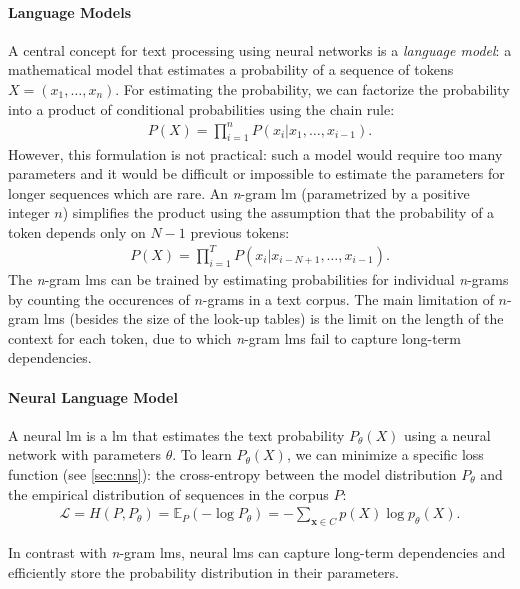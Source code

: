 {\paragraph{Language Models} A central concept for text processing using neural networks is a \emph{language model}: a mathematical model that estimates a probability of a sequence of tokens $X = (x_1, \ldots, x_n)$. For estimating the probability, we can factorize the probability into a product of conditional probabilities using the chain rule:
\begin{align}
    P(X) = \prod_{i=1}^n P(x_i|x_1, \hdots, x_{i-1}).
\end{align}
However, this formulation is not practical: such a model would require too many parameters and it would be difficult or impossible to estimate the parameters for longer sequences which are rare. An \emph{n}-gram \ac{lm} (parametrized by a positive integer $n$) simplifies the product using the assumption that the probability of a token depends only on $N-1$ previous tokens:
\begin{align}
    P(X) = \prod_{i=1}^T P(x_i|x_{i-N+1}, \hdots,x_{i-1}).
\end{align}
The \emph{n}-gram \acp{lm} can be trained by estimating probabilities for individual \emph{n}-grams by counting the occurences of $n$-grams in a text corpus. The main limitation of $n$-gram \acp{lm} (besides the size of the look-up tables) is the limit on the length of the context for each token, due to which \emph{n}-gram \acp{lm} fail to capture long-term dependencies.




\paragraph{Neural Language Model} A neural \ac{lm} is a \acl{lm} that estimates the text probability $P_\theta(X)$ using a neural network with parameters $\theta$. To learn $P_\theta(X)$, we can minimize a specific loss function (see \autoref{sec:nns}): the cross-entropy between the model distribution $P_\theta$ and the empirical distribution of sequences in the corpus $P$:
\begin{align}
    \mathcal{L} = H(P,P_\theta) = \mathbb{E}_P(-\log P_\theta) = -\sum_{\mathbf{x}\in C}p(X)\log p_{\theta}(X).
\end{align}

In contrast with \emph{n}-gram \acp{lm}, neural \acp{lm} can capture long-term dependencies and efficiently store the probability distribution in their parameters.

}
